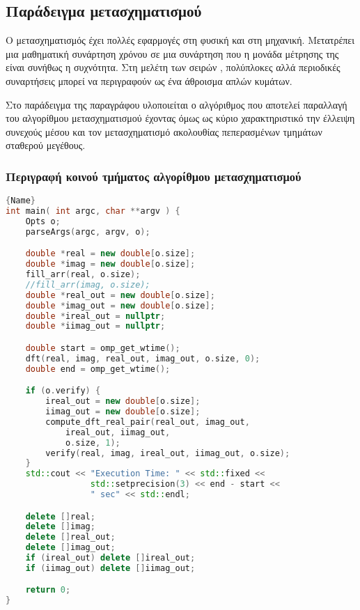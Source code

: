 \clearpage
\subsection{Παράδειγμα μετασχηματισμού }
Ο μετασχηματισμός  έχει πολλές εφαρμογές στη φυσική και στη μηχανική. Μετατρέπει μια μαθηματική συνάρτηση χρόνου σε μια συνάρτηση που η μονάδα μέτρησης της είναι συνήθως η συχνότητα. Στη μελέτη των σειρών , πολύπλοκες αλλά περιοδικές συναρτήσεις μπορεί να περιγραφούν ως ένα άθροισμα απλών κυμάτων.\cite{wiki_fourier}

Στο παράδειγμα της παραγράφου υλοποιείται ο αλγόριθμος \emph{} που αποτελεί παραλλαγή του αλγορίθμου μετασχηματισμού  έχοντας όμως ως κύριο χαρακτηριστικό την έλλειψη συνεχούς μέσου και τον μετασχηματισμό ακολουθίας πεπερασμένων τμημάτων σταθερού μεγέθους.
\clearpage
\subsubsection{Περιγραφή κοινού τμήματος αλγορίθμου μετασχηματισμού }
\begin{spacing}{1.0}
\begin{lstlisting}[showstringspaces=false, language=C++, caption={\en{DFT: main()}}, frame=tb]{Name}
int main( int argc, char **argv ) {
    Opts o;
    parseArgs(argc, argv, o);

    double *real = new double[o.size];
    double *imag = new double[o.size];
    fill_arr(real, o.size);
    //fill_arr(imag, o.size);
    double *real_out = new double[o.size];
    double *imag_out = new double[o.size];
    double *ireal_out = nullptr;
    double *iimag_out = nullptr;

    double start = omp_get_wtime();
    dft(real, imag, real_out, imag_out, o.size, 0);
    double end = omp_get_wtime();

    if (o.verify) {
        ireal_out = new double[o.size];
        iimag_out = new double[o.size];
        compute_dft_real_pair(real_out, imag_out, 
        	ireal_out, iimag_out,
        	o.size, 1);
        verify(real, imag, ireal_out, iimag_out, o.size);
    }
    std::cout << "Execution Time: " << std::fixed <<
                 std::setprecision(3) << end - start << 
                 " sec" << std::endl;

    delete []real;
    delete []imag;
    delete []real_out;
    delete []imag_out;
    if (ireal_out) delete []ireal_out;
    if (iimag_out) delete []iimag_out;

    return 0;
}

\end{lstlisting}
\end{spacing}
\clearpage

